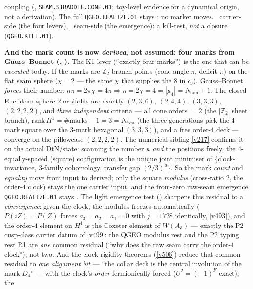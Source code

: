 \documentclass[11pt,a4paper]{article}
\newcommand{\Z}{\mathbb Z}
\begin{document}
\begin{keybox}
coupling (, \texttt{SEAM.STRADDLE.CONE.01}; toy-level
evidence for a dynamical origin, not a derivation).
The full \texttt{QGEO.REALIZE.01} stays \mO;
no marker moves. \mE\ carrier-side (the four
levers), \mO\ seam-side (the emergence): a kill-test, \emph{not} a closure (\texttt{QGEO.KILL.01}).
\par\smallskip\noindent\textbf{And the mark count is now \emph{derived}, not assumed: four marks from
Gauss--Bonnet (, ).} The K1 lever
(``exactly four marks'') is the one that can be \emph{executed} today. If the marks are $\Z_2$ branch points
(cone angle $\pi$, deficit $\pi$) on the flat seam sphere ($\chi{=}2$ --- the same $\chi$ that supplies the
$8$ in $c_3$), Gauss--Bonnet \emph{forces} their number: $n\pi=2\pi\chi=4\pi\Rightarrow
n=2\chi=4=|\mu_4|=N_{\mathrm{fam}}{+}1$. The closed Euclidean sphere $2$-orbifolds are exactly
$(2,3,6)$, $(2,4,4)$, $(3,3,3)$, $(2,2,2,2)$, and \emph{three independent} criteria --- all cone orders $=2$ (the
$|\Z_2|$ sheet branch), $\mathrm{rank}\,H^1=\#\text{marks}-1=3=N_{\mathrm{fam}}$ (the three generations pick
the $4$-mark square over the $3$-mark hexagonal $(3,3,3)$), and a free order-$4$ deck --- converge on the
pillowcase $(2,2,2,2)$. The numerical sibling \vref{v217} confirms it on the actual DtN/state: scanning the
number $n$ \emph{and} the positions freely, the $4$-equally-spaced (square) configuration is the unique joint
minimiser of \{clock-invariance, $3$-family cohomology, transfer gap $(2/3)^6$\}. So the mark \emph{count}
and \emph{equality} move from input to derived; only the square \emph{modulus} (cross-ratio $2$, the order-$4$
clock) stays the one carrier input, and the from-zero raw-seam emergence \texttt{QGEO.REALIZE.01} stays \mO.
The light emergence test () sharpens this residual to a
\emph{convergence}: given the clock, the modulus freezes automatically ($P(iZ)=P(Z)$ forces
$a_3=a_2=a_1=0$ with $j=1728$ identically, \vref{v493}), and the order-$4$ element on $H^1$ is the
Coxeter element of $W(A_3)$ --- exactly the P2 cusp-class carrier datum of \vref{v499}: the QGEO
modulus rest and the P2 typing rest R1 are \emph{one} common residual (``why does the raw seam carry
the order-$4$ clock''), not two. And the clock-rigidity theorems (\vref{v506}) reduce that common
residual to \emph{one alignment bit} --- ``the collar deck is the central involution of the
mark-$D_4$'' --- with the clock's \emph{order} fermionically forced ($U^2=(-1)^F$ exact); the

\end{keybox}
\end{document}
